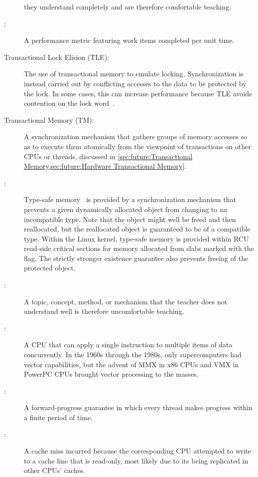 \begin{description}
	they understand completely and are therefore comfortable teaching.
\item[\IXG{Throughput}:]
	A performance metric featuring work items completed per unit time.
\item[Transactional Lock Elision (TLE):]
	The use of transactional memory to emulate locking.
	Synchronization is instead carried out by conflicting accesses
	to the data to be protected by the lock.
	In some cases, this can increase performance because TLE
	avoids contention on the lock
	word~\cite{MartinPohlack2011HTM2TLE,Kleen:2014:SEL:2566590.2576793,PascalFelber2016rwlockElision,SeongJaePark2020HTMRCUlock}.
\item[Transactional Memory (TM):]
	A synchronization mechanism that gathers groups of memory
	accesses so as to execute them atomically from the viewpoint
	of transactions on other CPUs or threads, discussed in
	\cref{sec:future:Transactional Memory,sec:future:Hardware Transactional Memory}.
\item[\IXG{Type-Safe Memory}:]
	Type-safe memory~\cite{Cheriton96a} is provided by a
	synchronization mechanism that prevents a given dynamically
	allocated object from changing to an incompatible type.
	Note that the object might well be freed and then reallocated, but
	the reallocated object is guaranteed to be of a compatible type.
	Within the Linux kernel, type-safe memory is provided within
	RCU read-side critical sections for memory allocated from slabs
	marked with the  flag.
	The strictly stronger existence guarantee also prevents freeing
	of the protected object.
\item[\IXG{Unteachable}:]
	A topic, concept, method, or mechanism that the teacher does
	not understand well is therefore uncomfortable teaching.
\item[\IXGr{Vector CPU}:]
	A CPU that can apply a single instruction to multiple items of
	data concurrently.
	In the 1960s through the 1980s, only supercomputers had vector
	capabilities, but the advent of MMX in x86 CPUs and VMX in
	PowerPC CPUs brought vector processing to the masses.
\item[\IXG{Wait Free}:]
	A forward-progress guarantee in which every thread makes
	progress within a finite period of time.
\item[\IXGalth{Write Miss}{write}{cache miss}:]
	A cache miss incurred because the corresponding CPU attempted
	to write to a cache line that is read-only, most likely due
	to its being replicated in other CPUs' caches.

\end{description}
